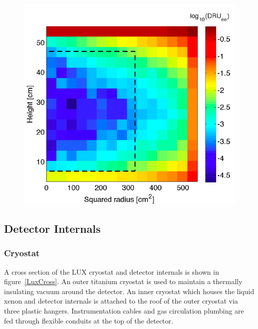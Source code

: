  \begin{figure} 
\includegraphics[scale=.5]{GammaBackgrounds.png} 
\label{GammaBackgrounds}
\end{figure}

\newpage

\subsection{Detector Internals}
\subsubsection{Cryostat} %


A cross section of the LUX cryostat and detector internals is shown in figure~\ref{LuxCross}.  An outer titanium cryostat is used to maintain a thermally insulating vacuum around the detector.  An inner cryostat which houses the liquid xenon and detector internals is attached to the roof of the outer cryostat via three plastic hangers.  Instrumentation cables and gas circulation plumbing are fed through flexible conduits at the top of the detector.  

